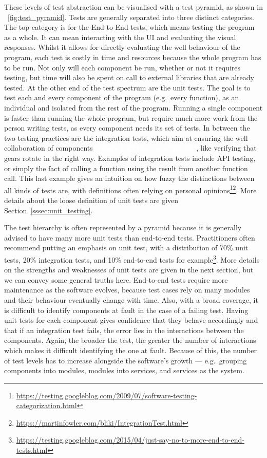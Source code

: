 \documentclass[a4paper,11pt]{sdm_internship}
\newcommand{\rephrase}[1]{\colorbox{BlueViolet!60}{\textcolor{white}{\textbf{$\sim$#1}}}}
\theoremstyle{definition}
\begin{document}
These levels of test abstraction can be visualised with a test pyramid, as shown in \figurename~\ref{fig:test_pyramid}.
Tests are generally separated into three distinct categories.
The top category is for the End-to-End tests, which means testing the program as a whole.
It can mean interacting with the UI and evaluating the visual responses.
Whilst it allows for directly evaluating the well behaviour of the program, each test is costly in time and resources because the whole program has to be run.
Not only will each component be run, whether or not it requires testing, but time will also be spent on call to external libraries that are already tested.
At the other end of the test spectrum are the unit tests.
The goal is to test each and every component of the program (e.g.\ every function), as an individual and isolated from the rest of the program.
Running a single component is faster than running the whole program, but require much more work from the person writing tests, as every component needs its set of tests.
In between the two testing practices are the integration tests, which aim at ensuring the well collaboration of components \rephrase{work together as expected}, like verifying that gears rotate in the right way.
Examples of integration tests include API testing, or simply the fact of calling a function using the result from another function call.
This last example gives an intuition on how fuzzy the distinctions between all kinds of tests are, with definitions often relying on personal opinions\footnote{\url{https://testing.googleblog.com/2009/07/software-testing-categorization.html}}\footnote{\url{https://martinfowler.com/bliki/IntegrationTest.html}}.
More details about the loose definition of unit tests are given Section~\ref{sssec:unit_testing}.

The test hierarchy is often represented by a pyramid because it is generally advised to have many more unit tests than end-to-end tests.
Practitioners often recommend putting an emphasis on unit test, with a distribution of 70\% unit tests, 20\% integration tests, and 10\% end-to-end tests for example\footnote{\url{https://testing.googleblog.com/2015/04/just-say-no-to-more-end-to-end-tests.html}}.
More details on the strengths and weaknesses of unit tests are given in the next section, but we can convey some general truths here.
End-to-end tests require more maintenance as the software evolves, because test cases rely on many modules and their behaviour eventually change with time.
Also, with a broad coverage, it is difficult to identify components at fault in the case of a failing test.
Having unit tests for each component gives confidence that they behave accordingly and that if an integration test fails, the error lies in the interactions between the components.
Again, the broader the test, the greater the number of interactions which makes it difficult identifying the one at fault.
Because of this, the number of test levels has to increase alongside the software's growth --- e.g.\ grouping components into modules, modules into services, and services as the system.
\end{document}
